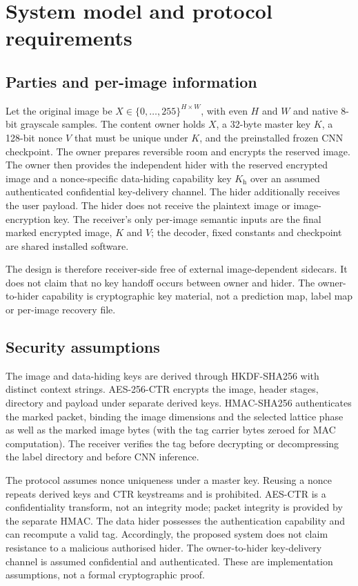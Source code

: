 \documentclass[preprint,12pt,a4paper]{elsarticle}
\newcommand{\Kh}{K_{\mathrm{h}}}
\begin{document}
\section{System model and protocol requirements}
\label{sec:model}

\subsection{Parties and per-image information}

Let the original image be $X\in\{0,\ldots,255\}^{H\times W}$, with even $H$ and $W$ and native 8-bit grayscale samples. The content owner holds $X$, a 32-byte master key $K$, a 128-bit nonce $V$ that must be unique under $K$, and the preinstalled frozen CNN checkpoint. The owner prepares reversible room and encrypts the reserved image. The owner then provides the independent hider with the reserved encrypted image and a nonce-specific data-hiding capability key $\Kh$ over an assumed authenticated confidential key-delivery channel. The hider additionally receives the user payload. The hider does not receive the plaintext image or image-encryption key. The receiver's only per-image semantic inputs are the final marked encrypted image, $K$ and $V$; the decoder, fixed constants and checkpoint are shared installed software.

The design is therefore receiver-side free of external image-dependent sidecars. It does not claim that no key handoff occurs between owner and hider. The owner-to-hider capability is cryptographic key material, not a prediction map, label map or per-image recovery file.

\subsection{Security assumptions}

The image and data-hiding keys are derived through HKDF-SHA256 with distinct context strings. AES-256-CTR encrypts the image, header stages, directory and payload under separate derived keys. HMAC-SHA256 authenticates the marked packet, binding the image dimensions and the selected lattice phase as well as the marked image bytes (with the tag carrier bytes zeroed for MAC computation). The receiver verifies the tag before decrypting or decompressing the label directory and before CNN inference.

The protocol assumes nonce uniqueness under a master key. Reusing a nonce repeats derived keys and CTR keystreams and is prohibited. AES-CTR is a confidentiality transform, not an integrity mode; packet integrity is provided by the separate HMAC. The data hider possesses the authentication capability and can recompute a valid tag. Accordingly, the proposed system does not claim resistance to a malicious authorised hider. The owner-to-hider key-delivery channel is assumed confidential and authenticated. These are implementation assumptions, not a formal cryptographic proof.
\end{document}
